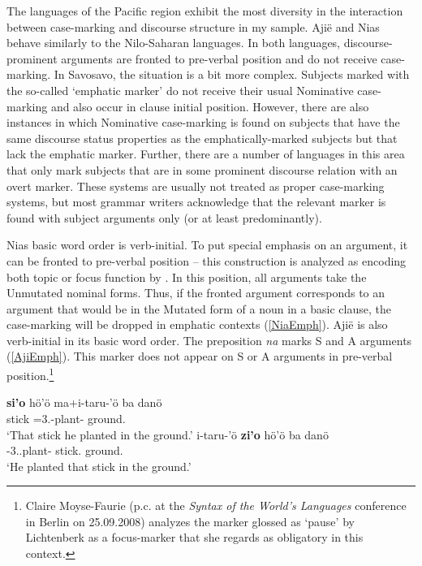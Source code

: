 The languages of the Pacific region exhibit the most diversity in the interaction between case-marking and discourse structure in my sample. 
Aji\"e and Nias behave similarly to the Nilo-Saharan languages. 
In both languages, discourse-prominent arguments are fronted to pre-verbal position and do not receive case-marking. 
In Savosavo, the situation is a bit more complex. 
Subjects marked with the so-called `emphatic marker' do not receive their usual Nominative case-marking and also occur in clause initial position. 
However, there are also instances in which Nominative case-marking is found on subjects that have the same discourse status properties as the emphatically-marked subjects but that lack the emphatic marker. 
Further, there are a number of languages in this area that only mark subjects that are in some prominent discourse relation with an overt marker. 
These systems are usually not treated as proper case-marking systems, but most grammar writers acknowledge that the relevant marker is found with subject arguments only (or at least predominantly).

Nias basic word order is verb-initial. 
To put special emphasis on an argument, it can be fronted to pre-verbal position -- this construction is analyzed as encoding both topic or focus function by \citet[60]{Donohue.Brown:1999}. 
In this position, all arguments take the Unmutated nominal forms. 
Thus, if the fronted argument corresponds to an argument that would be in the Mutated form of a noun in a basic clause, the case-marking will be dropped in emphatic contexts (\ref{NiaEmph}). 
Aji\"e is also verb-initial in its basic word order.  
The preposition \emph{na} marks S and A arguments (\ref{AjiEmph}). 
This marker does not appear on S or A arguments in pre-verbal position.\footnote{Claire Moyse-Faurie (p.c. at the \emph{Syntax of the World's Languages} conference in Berlin on 25.09.2008) analyzes the marker glossed as `pause' by Lichtenberk as a focus-marker that she regards as obligatory in this context.} 

\begin{exe}\ex\label{NiaEmph}
\begin{xlist}\ex\gll
\textbf{si'o} h\"o'\"o ma+i-taru-'\"o ba dan\"o\\
stick \dist{} \prf{}=3\sg{}.\rls{}-plant-\transitiv{} \loc{} ground.\mut{}\\
\glt `That stick he planted in the ground.'
\ex\gll 
i-taru-'\"o \textbf{zi'o} h\"o'\"o ba dan\"o\\
\prf{}-3\sg{}.\rls{}.plant-\transitiv{} stick.\mut{} \dist{} \loc{} ground.\mut{}\\
\glt `He planted that stick in the ground.'
\end{xlist}\end{exe}

